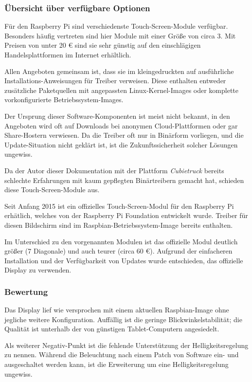 \documentclass[11pt,a4paper]{IEEEtran}
\begin{document}
\subsubsection{Übersicht über verfügbare Optionen}

Für den Raspberry Pi sind verschiedenste Touch-Screen-Module verfügbar.
Besonders häufig vertreten sind hier Module mit einer Größe von circa
\SI{3}{\inch}. Mit Preisen von unter 20 \euro{} sind sie sehr günstig auf den
einschlägigen Handelsplattformen im Internet erhältlich.

Allen Angeboten gemeinsam ist, dass sie im kleingedruckten auf ausführliche
Installations-Anweisungen für Treiber verweisen. Diese enthalten entweder
zusätzliche Paketquellen mit angepassten Linux-Kernel-Images oder komplette
vorkonfigurierte Betriebssystem-Images. 

Der Ursprung dieser Software-Komponenten ist meist nicht bekannt, in den
Angeboten wird oft auf Downloads bei anonymen Cloud-Plattformen oder gar
Share-Hostern verwiesen. Da die Treiber oft nur in Binärform vorliegen, und die
Update-Situation nicht geklärt ist, ist die Zukunftssicherheit solcher Lösungen
ungewiss.

Da der Autor dieser Dokumentation mit der Plattform \emph{Cubietruck} bereits
schlechte Erfahrungen mit kaum gepflegten Binärtreibern gemacht hat, schieden
diese Touch-Screen-Module aus.

Seit Anfang 2015 ist ein offizielles Touch-Screen-Modul für den Raspberry Pi
erhätlich, welches von der Raspberry Pi Foundation entwickelt wurde. Treiber
für diesen Bildschirm sind im Raspbian-Betriebssystem-Image bereits enthalten.

Im Unterschied zu den vorgenannten Modulen ist das offizielle Modul deutlich
größer (\SI{7}{\inch} Diagonale) und auch teurer (circa 60 \euro). Aufgrund der
einfacheren Installation und der Verfügbarkeit von Updates wurde entschieden,
das offizielle Display zu verwenden.

\subsubsection{Bewertung}

Das Display lief wie versprochen mit einem aktuellen Raspbian-Image ohne
jegliche weitere Konfiguration. Auffällig ist die geringe
Blickwinkelstabilität; die Qualität ist unterhalb der von günstigen
Tablet-Computern angesiedelt.

Als weiterer Negativ-Punkt ist die fehlende Unterstützung der
Helligkeitsregelung zu nennen. Während die Beleuchtung nach einem Patch von
Software ein- und ausgeschaltet werden kann, ist die Erweiterung um eine
Helligkeitsregelung ungewiss\autocite{TouchBacklight}.
\end{document}
